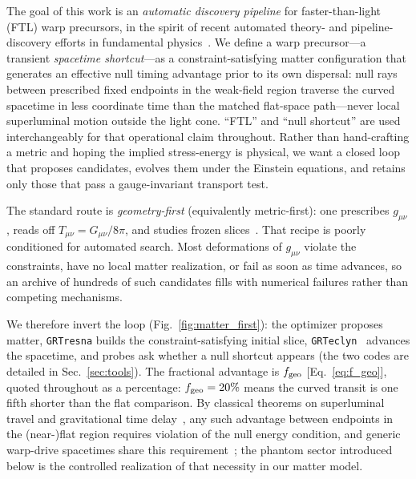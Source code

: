 \documentclass[twocolumn,floatfix,aps,prd,nofootinbib]{revtex4-2}
\begin{document}
The goal of this work is an \emph{automatic discovery pipeline} for
faster-than-light (FTL) warp precursors, in the spirit of recent automated
theory- and pipeline-discovery efforts in fundamental
physics~\cite{alexander2026albert,qiu2026collideragent}. We define a warp
precursor---a transient \emph{spacetime shortcut}---as a
constraint-satisfying matter configuration that generates an effective null
timing advantage prior to its own dispersal: null rays between prescribed fixed
endpoints in the weak-field region traverse the curved spacetime in less
coordinate time than the matched flat-space path---never local superluminal
motion outside the light cone. ``FTL'' and ``null shortcut'' are used
interchangeably for that operational claim throughout. Rather
than hand-crafting a metric and hoping the implied stress-energy is physical,
we want a closed loop that proposes candidates, evolves them under the
Einstein equations, and retains only those that pass a gauge-invariant
transport test.

The standard route is \emph{geometry-first} (equivalently metric-first): one
prescribes $g_{\mu\nu}$, reads off $T_{\mu\nu}=G_{\mu\nu}/8\pi$, and studies
frozen slices~\cite{alcubierre94,natario02,helmerich2024warpfactory}.
That recipe is poorly conditioned for automated search. Most deformations of
$g_{\mu\nu}$ violate the constraints, have no local matter realization, or fail
as soon as time advances, so an archive of hundreds of such candidates fills
with numerical failures rather than competing mechanisms.

We therefore invert the loop (Fig.~\ref{fig:matter_first}): the optimizer
proposes matter, \texttt{GRTresna} builds the constraint-satisfying initial
slice, \texttt{GRTeclyn}~\cite{grteclyn,grchombo} advances the spacetime, and
probes ask whether a null shortcut appears (the two codes are detailed in
Sec.~\ref{sec:tools}). The fractional advantage is $f_{\rm geo}$
[Eq.~\eqref{eq:f_geo}], quoted throughout as a percentage: $f_{\rm geo}=20\%$
means the curved transit is one fifth shorter than the flat comparison. By classical theorems on
superluminal travel and gravitational time
delay~\cite{olum98,gaowald00,visser00}, any such advantage between endpoints
in the (near-)flat region requires violation of the null energy condition,
and generic warp-drive spacetimes share this
requirement~\cite{santiago2022}; the phantom sector introduced below is the
controlled realization of that necessity in our matter model.
\end{document}
